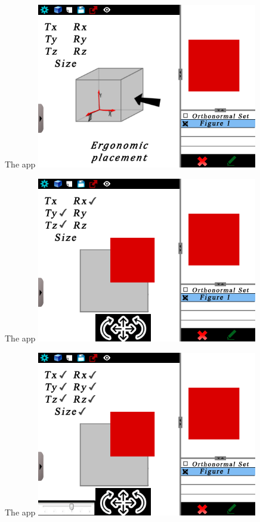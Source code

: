 \documentclass[a4paper,10pt]{beamer}
\begin{document}
			\begin{frame}{The app}
				\includegraphics[height=205pt]{maquette/maquette_5.png}
			\end{frame}
			
			\begin{frame}{The app}
				\includegraphics[height=205pt]{maquette/maquette_6.png}
			\end{frame}
			
			\begin{frame}{The app}
				\includegraphics[height=205pt]{maquette/maquette_7.png}
			\end{frame}
			
\end{document}
